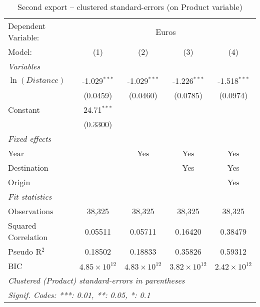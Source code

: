 \begin{table}[htbp]
   \caption{Second export -- clustered standard-errors (on Product variable)}
   \centering
   \begin{tabular}{lcccc}
      \tabularnewline \midrule \midrule
      Dependent Variable: & \multicolumn{4}{c}{Euros}\\
      Model:              & (1)                   & (2)                   & (3)                   & (4)\\  
      \midrule
      \emph{Variables}\\
      $\ln (Distance)$    & -1.029$^{***}$        & -1.029$^{***}$        & -1.226$^{***}$        & -1.518$^{***}$\\   
                          & (0.0459)              & (0.0460)              & (0.0785)              & (0.0974)\\   
      Constant            & 24.71$^{***}$         &                       &                       &   \\   
                          & (0.3300)              &                       &                       &   \\   
      \midrule
      \emph{Fixed-effects}\\
      Year                &                       & Yes                   & Yes                   & Yes\\  
      Destination         &                       &                       & Yes                   & Yes\\  
      Origin              &                       &                       &                       & Yes\\  
      \midrule
      \emph{Fit statistics}\\
      Observations        & 38,325                & 38,325                & 38,325                & 38,325\\  
      Squared Correlation & 0.05511               & 0.05711               & 0.16420               & 0.38479\\  
      Pseudo R$^2$        & 0.18502               & 0.18833               & 0.35826               & 0.59312\\  
      BIC                 & $4.85\times 10^{12}$  & $4.83\times 10^{12}$  & $3.82\times 10^{12}$  & $2.42\times 10^{12}$\\   
      \midrule \midrule
      \multicolumn{5}{l}{\emph{Clustered (Product) standard-errors in parentheses}}\\
      \multicolumn{5}{l}{\emph{Signif. Codes: ***: 0.01, **: 0.05, *: 0.1}}\\
   \end{tabular}
\end{table}


